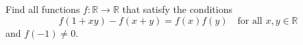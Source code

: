 Find all functions $f : \mathbb{R} \to \mathbb{R}$ that satisfy the conditions
\[
f(1 + xy) - f(x + y) = f(x)f(y) \quad \text{for all } x, y \in \mathbb{R}
\]
and $f(-1) \neq 0$.
